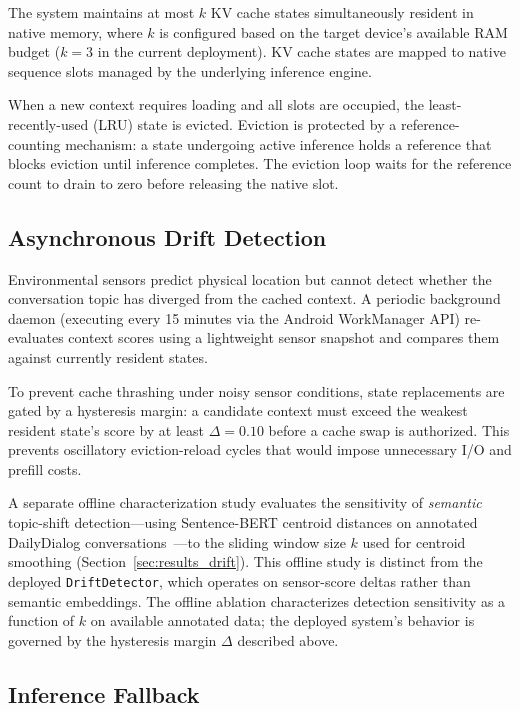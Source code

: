 \documentclass[journal]{IEEEtran}
\begin{document}
The system maintains at most $k$ KV cache states simultaneously resident in native memory, where $k$ is configured based on the target device's available RAM budget ($k = 3$ in the current deployment). KV cache states are mapped to native sequence slots managed by the underlying inference engine.

When a new context requires loading and all slots are occupied, the least-recently-used (LRU) state is evicted. Eviction is protected by a reference-counting mechanism: a state undergoing active inference holds a reference that blocks eviction until inference completes. The eviction loop waits for the reference count to drain to zero before releasing the native slot.

\subsection{Asynchronous Drift Detection}
\label{sec:drift}

Environmental sensors predict physical location but cannot detect whether the conversation topic has diverged from the cached context. A periodic background daemon (executing every 15 minutes via the Android WorkManager API) re-evaluates context scores using a lightweight sensor snapshot and compares them against currently resident states.

To prevent cache thrashing under noisy sensor conditions, state replacements are gated by a hysteresis margin: a candidate context must exceed the weakest resident state's score by at least $\Delta = 0.10$ before a cache swap is authorized. This prevents oscillatory eviction-reload cycles that would impose unnecessary I/O and prefill costs.

A separate offline characterization study evaluates the sensitivity of \emph{semantic} topic-shift detection---using Sentence-BERT centroid distances on annotated DailyDialog conversations~\cite{dailydialog}---to the sliding window size $k$ used for centroid smoothing (Section~\ref{sec:results_drift}). This offline study is distinct from the deployed \texttt{DriftDetector}, which operates on sensor-score deltas rather than semantic embeddings. The offline ablation characterizes detection sensitivity as a function of $k$ on available annotated data; the deployed system's behavior is governed by the hysteresis margin $\Delta$ described above.

\subsection{Inference Fallback}
\label{sec:fallback}
\end{document}
